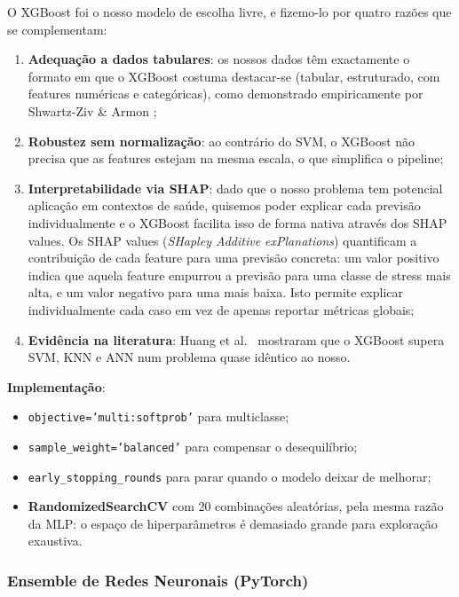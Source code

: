 \documentclass[12pt,a4paper]{article}
\begin{document}
O XGBoost \cite{chen2016} foi o nosso modelo de escolha livre, e fizemo-lo por quatro
razões que se complementam:
\begin{enumerate}
  \item \textbf{Adequação a dados tabulares}: os nossos dados têm exactamente o formato
    em que o XGBoost costuma destacar-se (tabular, estruturado, com features numéricas
    e categóricas), como demonstrado empiricamente por Shwartz-Ziv \& Armon \cite{shwartz2022};
  \item \textbf{Robustez sem normalização}: ao contrário do SVM, o XGBoost não precisa
    que as features estejam na mesma escala, o que simplifica o pipeline;
  \item \textbf{Interpretabilidade via SHAP}: dado que o nosso problema tem potencial
    aplicação em contextos de saúde, quisemos poder explicar cada previsão individualmente
    e o XGBoost facilita isso de forma nativa através dos SHAP values. Os SHAP values
    (\textit{SHapley Additive exPlanations}) quantificam a contribuição de cada
    feature para uma previsão concreta: um valor positivo indica que aquela feature
    empurrou a previsão para uma classe de stress mais alta, e um valor negativo para
    uma mais baixa. Isto permite explicar individualmente cada caso em vez de apenas
    reportar métricas globais;
  \item \textbf{Evidência na literatura}: Huang et al.\ \cite{huang2024} mostraram
    que o XGBoost supera SVM, KNN e ANN num problema quase idêntico ao nosso.
\end{enumerate}

\textbf{Implementação}:
\begin{itemize}
  \item \texttt{objective='multi:softprob'} para multiclasse;
  \item \texttt{sample\_weight='balanced'} para compensar o desequilíbrio;
  \item \texttt{early\_stopping\_rounds} para parar quando o modelo deixar de melhorar;
  \item \textbf{RandomizedSearchCV} com 20 combinações aleatórias, pela mesma
    razão da MLP: o espaço de hiperparâmetros é demasiado grande para exploração exaustiva.
\end{itemize}

\subsubsection{Ensemble de Redes Neuronais (PyTorch)}
\end{document}
